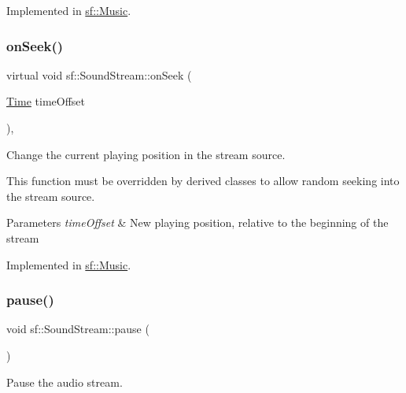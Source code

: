 Implemented in \hyperlink{classsf_1_1_music_aca1bcb4e5d56a854133e74bd86374463}{sf\+::\+Music}.

\mbox{\label{classsf_1_1_sound_stream_a907036dd2ca7d3af5ead316e54b75997}} 
\subsubsection{\texorpdfstring{on\+Seek()}{onSeek()}}
{\footnotesize\ttfamily virtual void sf\+::\+Sound\+Stream\+::on\+Seek (\begin{DoxyParamCaption}\item[{\hyperlink{classsf_1_1_time}{Time}}]{time\+Offset }\end{DoxyParamCaption})\hspace{0.3cm}{\ttfamily [protected]}, {}}



Change the current playing position in the stream source. 

This function must be overridden by derived classes to allow random seeking into the stream source.


\begin{DoxyParams}{Parameters}
{\em time\+Offset} & New playing position, relative to the beginning of the stream \\
\hline
\end{DoxyParams}


Implemented in \hyperlink{classsf_1_1_music_a15119cc0419c16bb334fa0698699c02e}{sf\+::\+Music}.

\mbox{\label{classsf_1_1_sound_stream_a932ff181e661503cad288b4bb6fe45ca}} 
\subsubsection{\texorpdfstring{pause()}{pause()}}
{\footnotesize\ttfamily void sf\+::\+Sound\+Stream\+::pause (\begin{DoxyParamCaption}{ }\end{DoxyParamCaption})}



Pause the audio stream. 

